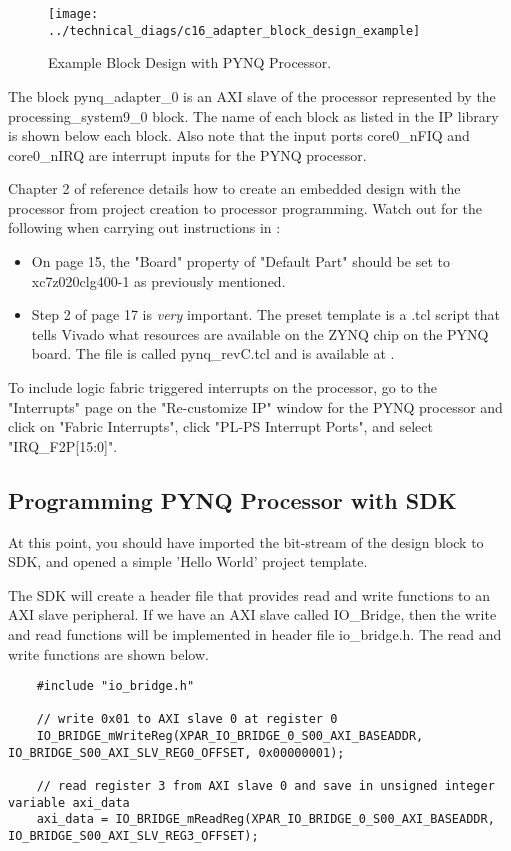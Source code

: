 \documentclass[]{report}
\begin{document}
\begin{figure}[h]
	\centering
	\texttt{[image: ../technical\_diags/c16\_adapter\_block\_design\_example]}
	\caption{Example Block Design with PYNQ Processor.}
	\label{fig:adapter block design example}
\end{figure}

The block pynq\_adapter\_0 is an AXI slave of the processor represented by the processing\_system9\_0 block. The name of each block as listed in the IP library is shown below each block. Also note that the input ports core0\_nFIQ and core0\_nIRQ are interrupt inputs for the PYNQ processor.

Chapter 2 of reference \cite{ug zynq embedded design} details how to create an embedded design with the processor from project creation to processor programming. Watch out for the following when carrying out instructions in \cite{ug zynq embedded design}:
\begin{itemize}
	\item On page 15, the "Board" property of "Default Part" should be set to xc7z020clg400-1 as previously mentioned.
	\item Step 2 of page 17 is \textit{very} important. The preset template is a .tcl script that tells Vivado what resources are available on the ZYNQ chip on the PYNQ board. The file is called pynq\_revC.tcl and is available at \cite{pynq docs and support files}.
\end{itemize}

To include logic fabric triggered interrupts on the processor, go to the "Interrupts" page on the "Re-customize IP" window for the PYNQ processor and click on "Fabric Interrupts", click "PL-PS Interrupt Ports", and select "IRQ\_F2P[15:0]".

\subsection{Programming PYNQ Processor with SDK}

At this point, you should have imported the bit-stream of the design block to SDK, and opened a simple 'Hello World' project template.

The SDK will create a header file that provides read and write functions to an AXI slave peripheral. If we have an AXI slave called IO\_Bridge, then the write and read functions will be implemented in header file io\_bridge.h. The read and write functions are shown below.
\begin{verbatim}
	#include "io_bridge.h"
	
	// write 0x01 to AXI slave 0 at register 0
    IO_BRIDGE_mWriteReg(XPAR_IO_BRIDGE_0_S00_AXI_BASEADDR, IO_BRIDGE_S00_AXI_SLV_REG0_OFFSET, 0x00000001);
	
	// read register 3 from AXI slave 0 and save in unsigned integer variable axi_data
	axi_data = IO_BRIDGE_mReadReg(XPAR_IO_BRIDGE_0_S00_AXI_BASEADDR, IO_BRIDGE_S00_AXI_SLV_REG3_OFFSET);
\end{verbatim}
\end{document}
